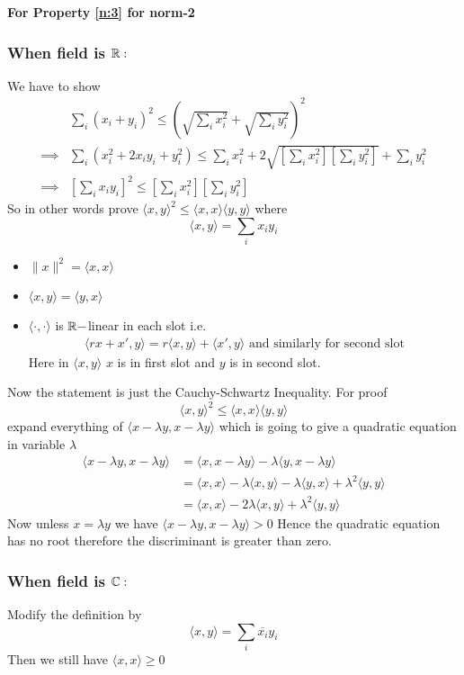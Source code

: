 \begin{myproof} \textbf{For Property \ref{n:3} for norm-2}	\subsubsection*{\textbf{When field is $\mathbb{R}:$}} We have to show\begin{align*}
		         & \sum_i(x_i+y_i)^2\leq \left(\sqrt{\sum_ix_i^2} +\sqrt{\sum_iy_i^2}\right)^2                                       \\
		\implies & \sum_i (x_i^2+2x_iy_i+y_i^2)\leq \sum_ix_i^2+2\sqrt{\left[\sum_ix_i^2\right]\left[\sum_iy_i^2\right]}+\sum_iy_i^2 \\
		\implies & \left[\sum_ix_iy_i\right]^2\leq \left[\sum_ix_i^2\right]\left[\sum_iy_i^2\right]
	\end{align*}So in other words prove $\langle x,y\rangle^2 \leq \langle x,x\rangle\langle y,y\rangle$ where
	$$\langle x,y\rangle =\sum\limits_i x_iy_i$$

	\begin{note}
		\begin{itemize}
			\item $\|x\|^2=\langle x,x\rangle$
			\item $\langle x,y\rangle=\langle y,x\rangle$
			\item $\langle \cdot,\cdot\rangle$ is $\mathbb{R}-$linear in each slot i.e. \begin{align*}
				      \langle rx+x',y\rangle=r\langle x,y\rangle+\langle x',y\rangle	\text{ and similarly for second slot}
			      \end{align*}Here in $\langle x,y\rangle$ $x$ is in first slot and $y$ is in second slot.
		\end{itemize}
	\end{note}Now the statement is just the Cauchy-Schwartz Inequality. For proof $$\langle x,y\rangle^2\leq \langle x,x\rangle\langle y,y\rangle $$ expand everything of $\langle x-\lambda y,x-\lambda y\rangle$ which is going to give a quadratic equation in variable $\lambda $ \begin{align*}
		\langle x-\lambda y,x-\lambda y\rangle & =\langle x,x-\lambda y\rangle-\lambda\langle y,x-\lambda y\rangle                                       \\
		                                       & =\langle x ,x\rangle -\lambda\langle x,y\rangle -\lambda\langle y,x\rangle +\lambda^2\langle y,y\rangle \\
		                                       & =\langle x,x\rangle -2\lambda\langle x,y\rangle+\lambda^2\langle y,y\rangle
	\end{align*}Now unless $x=\lambda y$ we have $\langle x-\lambda y,x-\lambda y\rangle>0$ Hence the quadratic equation has no root therefore the discriminant is greater than zero.

	\subsubsection*{\textbf{When field is $\mathbb{C}:$}}Modify the definition by $$\langle x,y\rangle=\sum_i\overline{x_i}y_i$$Then we still have $\langle x,x\rangle\geq 0$
\end{myproof}
